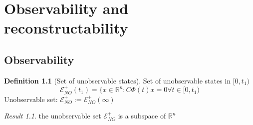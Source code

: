\documentclass{book}
\newcommand{\R}{\mathbb{R}}
\theoremstyle{definition}
\newtheorem{definition}{Definition}[section]
\theoremstyle{remark}
\theoremstyle{remark}
\newtheorem*{result}{Result}
\begin{document}
\chapter{Observability and reconstructability}
\section{Observability}
\begin{definition}[Set of unobservable states]
    Set of unobservable states in $[0,t_1)$
    \[
        \mathcal{E}^+_{NO}(t_1) = \{x\in \R^n : C\Phi(t)x=0 \forall t \in [0,t_1)
    \]
    Unobservable set: $\mathcal{E}^+_{NO}:=\mathcal{E}^+_{NO}(\infty)$
\end{definition}
\begin{result}
    the unobservable set $\mathcal{E}^+_{NO}$ is a subspace of $\R^n$
\end{result}
\end{document}
